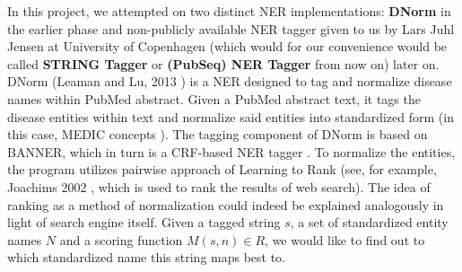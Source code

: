 In this project, we attempted on two distinct NER implementations: \textbf{DNorm} in the earlier phase and non-publicly available NER tagger given to us by Lars Juhl Jensen at University of Copenhagen (which would for our convenience would be called \textbf{STRING Tagger} or \textbf{(PubSeq) NER Tagger} from now on) later on. DNorm (Leaman and Lu, 2013 \citep{leaman2013dnorm}) is a NER designed to tag and normalize disease names within PubMed abstract. Given a PubMed abstract text, it tags the disease entities within text and normalize said entities into standardized form (in this case, MEDIC concepts \citep{davis2012medic}). The tagging component of DNorm is based on BANNER, which in turn is a CRF-based NER tagger \citep{leaman2008banner}. To normalize the entities, the program utilizes pairwise approach of Learning to Rank \citep{liu2009learning} (see, for example, Joachims 2002 \citep{joachims2002optimizing}, which is used to rank the results of web search). The idea of ranking as a method of normalization could indeed be explained analogously in light of search engine itself. Given a tagged string $s$, a set of standardized entity names $N$ and a scoring function $M(s, n) \in R$, we would like to find out to which standardized name this string maps best to.

